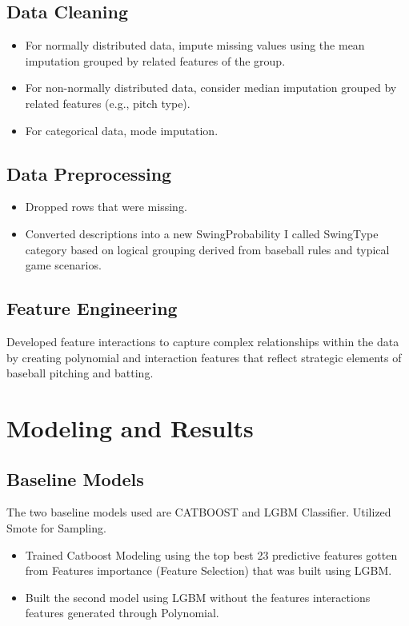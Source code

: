 \documentclass{article}
\begin{document}
\subsection*{Data Cleaning}
\begin{itemize}
    \item For normally distributed data, impute missing values using the mean imputation grouped by related features of the group.
    \item For non-normally distributed data, consider median imputation grouped by related features (e.g., pitch type).
    \item For categorical data, mode imputation.
\end{itemize}

\subsection*{Data Preprocessing}
\begin{itemize}
    \item Dropped rows that were missing.
    \item Converted descriptions into a new SwingProbability I called SwingType category based on logical grouping derived from baseball rules and typical game scenarios.
\end{itemize}

\subsection*{Feature Engineering}
Developed feature interactions to capture complex relationships within the data by creating polynomial and interaction features that reflect strategic elements of baseball pitching and batting.

\section*{Modeling and Results}
\subsection*{Baseline Models}
The two baseline models used are CATBOOST and LGBM Classifier. Utilized Smote for Sampling.
\begin{itemize}
    \item Trained Catboost Modeling using the top best 23 predictive features gotten from Features importance (Feature Selection) that was built using LGBM.
    \item Built the second model using LGBM without the features interactions features generated through Polynomial.
\end{itemize}
\end{document}
